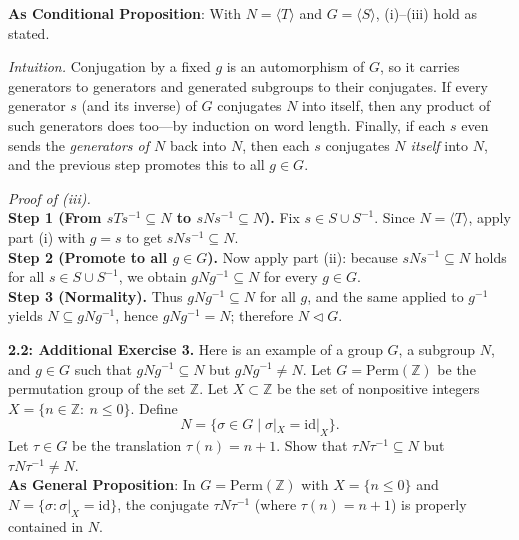 \documentclass[12pt]{article}
\theoremstyle{definition}
\begin{document}
\noindent \textbf{As Conditional Proposition}: With $N=\langle T\rangle$ and $G=\langle S\rangle$, (i)–(iii) hold as stated.

\newpage

\dotfill

\emph{Intuition.} Conjugation by a fixed $g$ is an automorphism of $G$, so it carries generators to generators and generated subgroups to their conjugates. If every generator $s$ (and its inverse) of $G$ conjugates $N$ into itself, then any product of such generators does too—by induction on word length. Finally, if each $s$ even sends the \emph{generators of $N$} back into $N$, then each $s$ conjugates \emph{$N$ itself} into $N$, and the previous step promotes this to all $g\in G$.\\

\dotfill

\emph{Proof of (iii).}\\
\textbf{Step 1 (From $sTs^{-1}\subseteq N$ to $sNs^{-1}\subseteq N$).} Fix $s\in S\cup S^{-1}$. Since $N=\langle T\rangle$, apply part (i) with $g=s$ to get $sNs^{-1}\subseteq N$.\\
\textbf{Step 2 (Promote to all $g\in G$).} Now apply part (ii): because $sNs^{-1}\subseteq N$ holds for all $s\in S\cup S^{-1}$, we obtain $gNg^{-1}\subseteq N$ for every $g\in G$.\\
\textbf{Step 3 (Normality).} Thus $gNg^{-1}\subseteq N$ for all $g$, and the same applied to $g^{-1}$ yields $N\subseteq gNg^{-1}$, hence $gNg^{-1}=N$; therefore $N\lhd G$.\\

\newpage

\newpage

\noindent \textbf{2.2: Additional Exercise 3.} 
Here is an example of a group $G$, a subgroup $N$, and $g\in G$ such that $gNg^{-1}\subseteq N$ but $gNg^{-1}\ne N$. Let $G=\mathrm{Perm}(\mathbb Z)$ be the permutation group of the set $\mathbb Z$. Let $X\subset\mathbb Z$ be the set of nonpositive integers $X=\{n\in\mathbb Z:\ n\le 0\}$. Define 
\[
N=\{\sigma\in G\mid \sigma|_X=\mathrm{id}|_X\}.
\]
Let $\tau\in G$ be the translation $\tau(n)=n+1$. Show that $\tau N\tau^{-1}\subseteq N$ but $\tau N\tau^{-1}\ne N$.\\ %

\noindent\textbf{As General Proposition}: In $G=\mathrm{Perm}(\mathbb Z)$ with $X=\{n\le 0\}$ and $N=\{\sigma:\sigma|_X=\mathrm{id}\}$, the conjugate $\tau N\tau^{-1}$ (where $\tau(n)=n+1$) is properly contained in $N$.\\
\end{document}
